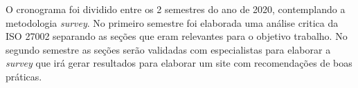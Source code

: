 O cronograma foi dividido entre os 2 semestres do ano de 2020, contemplando
a metodologia \textit{survey}. No primeiro semestre foi elaborada uma análise critica da ISO
27002 separando as seções que eram relevantes para o objetivo trabalho. No segundo
semestre as seções serão validadas com especialistas para elaborar a \textit{survey} que irá gerar
resultados para elaborar um site com recomendações de boas práticas.

